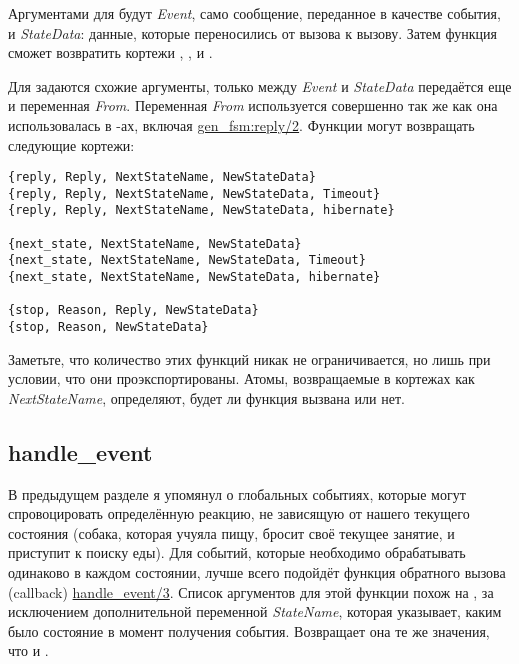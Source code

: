 Аргументами для  будут \emph{Event}, само сообщение, переданное в качестве события, и \emph{StateData}: данные, которые переносились от вызова к вызову.
Затем функция  сможет возвратить кортежи , ,  и .

Для  задаются схожие аргументы, только между \emph{Event} и \emph{StateData} передаётся еще и переменная \emph{From}.
Переменная \emph{From} используется совершенно так же как она использовалась в \--ах, включая \href{http://erldocs.com/R15B/stdlib/gen\_fsm.html\#reply/2}{gen\_fsm:reply/2}.
Функции  могут возвращать следующие кортежи:
\begin{lstlisting}[style=erlang]
{reply, Reply, NextStateName, NewStateData}
{reply, Reply, NextStateName, NewStateData, Timeout}
{reply, Reply, NextStateName, NewStateData, hibernate}

{next_state, NextStateName, NewStateData}
{next_state, NextStateName, NewStateData, Timeout}
{next_state, NextStateName, NewStateData, hibernate}

{stop, Reason, Reply, NewStateData}
{stop, Reason, NewStateData}
\end{lstlisting}

Заметьте, что количество этих функций никак не ограничивается, но лишь при условии, что они проэкспортированы.
Атомы, возвращаемые в кортежах как \emph{NextStateName}, определяют, будет ли функция вызвана или нет.

\subsection{handle\_event}
\label{handle-event}
В предыдущем разделе я упомянул о глобальных событиях, которые могут спровоцировать определённую реакцию, не зависящую от нашего текущего состояния (собака, которая учуяла пищу, бросит своё текущее занятие, и приступит к поиску еды).
Для событий, которые необходимо обрабатывать одинаково в каждом состоянии, лучше всего подойдёт функция обратного вызова (callback) \href{http://erldocs.com/R15B/stdlib/gen\_fsm.html\#handle\_event/3}{handle\_event/3}.
Список аргументов для этой функции похож на , за исключением дополнительной переменной \emph{StateName}, которая указывает, каким было состояние в момент получения события.
Возвращает она те же значения, что и .

